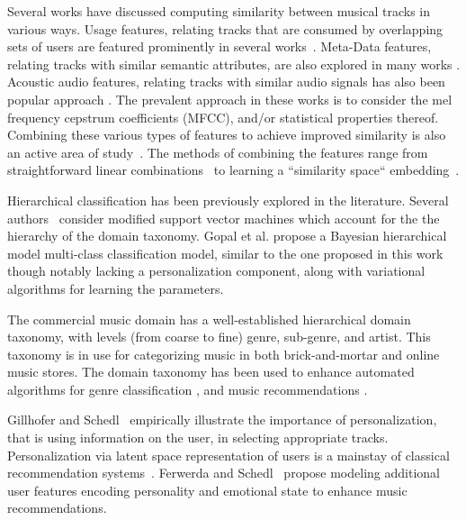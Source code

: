 Several works have discussed computing similarity between musical tracks in various ways. Usage features, relating tracks that are consumed by overlapping sets of users are featured prominently in several works~\cite{item2vec,Dror2011,Mcfee_learningsimilarity_CF}. Meta-Data features, relating tracks with similar semantic attributes, are also explored in many works \cite{Bogdanov_content,  McfeeEtAl_2009_HeteEmbeForSubj, Pauws:ISMIR02,SlaneyEtAl_2008_LearAMetrFor}. Acoustic audio features, relating tracks with similar audio signals has also been popular approach \cite{DoplerEtAl_2008_AcceMusiCollVia, Lee2011,a2mf}. The prevalent approach in these works is to 
consider the mel frequency cepstrum coefficients (MFCC), and/or statistical properties thereof.
Combining these various types of features to achieve improved similarity is also an active area of study~\cite{Knees:2006, Mcfee_learningsimilarity_CF,McFee_multi_similarities,Schedl:2015}. The methods of combining the features range from straightforward linear combinations~\cite{Knees:2006} to learning a ``similarity space`` embedding~\cite{McFee_multi_similarities}.


Hierarchical classification has been previously explored in the literature.   Several authors~\cite{Cai2004,Zhou2011} consider modified support vector machines which account for the the hierarchy of the domain taxonomy. Gopal et al. \cite{NIPS2012_4609} propose a Bayesian hierarchical model multi-class classification model, similar to the one proposed in this work though notably lacking a personalization component, along with variational algorithms for learning the parameters. 

The commercial music domain has a well-established hierarchical domain taxonomy, with  levels (from coarse to fine) genre, sub-genre, and artist. This taxonomy is in use for categorizing music in both brick-and-mortar and online music stores. The domain taxonomy has been used to enhance automated algorithms for genre classification \cite{DecoroEtAl_2007_BayeAggrForHier}, and music recommendations \cite{Dror2011,Mnih2012}.



Gillhofer and Schedl~\cite{Gillhofer2015} empirically illustrate the importance of personalization, that is using information on the user, in selecting appropriate tracks. Personalization via latent space representation of users is a mainstay of classical recommendation systems~\cite{KorenBV09}. Ferwerda and Schedl~\cite{personalized_playlist_schedl} propose modeling additional user features encoding personality and emotional state to enhance music recommendations.

